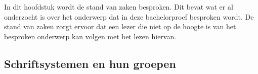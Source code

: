 \chapter{}
\label{ch:stand-van-zaken}


In dit hoofdstuk wordt de stand van zaken besproken.
Dit bevat wat er al onderzocht is over het onderwerp dat in deze bachelorproef besproken wordt.
De stand van zaken zorgt ervoor dat een lezer die niet op de hoogte is van het besproken onderwerp kan volgen met het lezen hiervan.





\section{Schriftsystemen en hun groepen}

